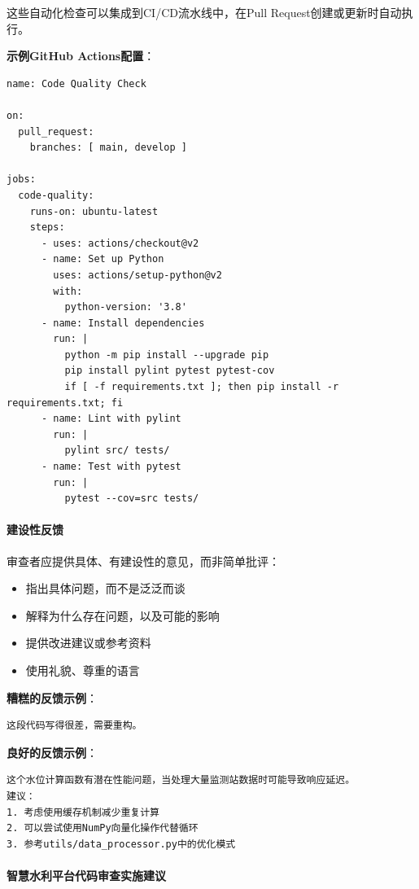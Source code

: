这些自动化检查可以集成到CI/CD流水线中，在Pull
Request创建或更新时自动执行。

\textbf{示例GitHub Actions配置}：

\begin{lstlisting}
name: Code Quality Check

on:
  pull_request:
    branches: [ main, develop ]

jobs:
  code-quality:
    runs-on: ubuntu-latest
    steps:
      - uses: actions/checkout@v2
      - name: Set up Python
        uses: actions/setup-python@v2
        with:
          python-version: '3.8'
      - name: Install dependencies
        run: |
          python -m pip install --upgrade pip
          pip install pylint pytest pytest-cov
          if [ -f requirements.txt ]; then pip install -r requirements.txt; fi
      - name: Lint with pylint
        run: |
          pylint src/ tests/
      - name: Test with pytest
        run: |
          pytest --cov=src tests/
\end{lstlisting}

\paragraph{建设性反馈}\label{ux5efaux8bbeux6027ux53cdux9988}

审查者应提供具体、有建设性的意见，而非简单批评：

\begin{itemize}
\tightlist
\item
  指出具体问题，而不是泛泛而谈
\item
  解释为什么存在问题，以及可能的影响
\item
  提供改进建议或参考资料
\item
  使用礼貌、尊重的语言
\end{itemize}

\textbf{糟糕的反馈示例}：

\begin{lstlisting}
这段代码写得很差，需要重构。
\end{lstlisting}

\textbf{良好的反馈示例}：

\begin{lstlisting}
这个水位计算函数有潜在性能问题，当处理大量监测站数据时可能导致响应延迟。
建议：
1. 考虑使用缓存机制减少重复计算
2. 可以尝试使用NumPy向量化操作代替循环
3. 参考utils/data_processor.py中的优化模式
\end{lstlisting}

\paragraph{智慧水利平台代码审查实施建议}\label{ux667aux6167ux6c34ux5229ux5e73ux53f0ux4ee3ux7801ux5ba1ux67e5ux5b9eux65bdux5efaux8bae}

